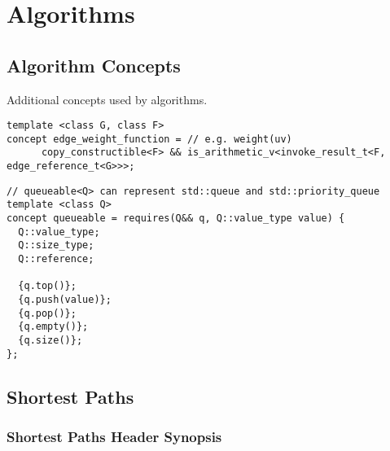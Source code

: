 \section{Algorithms}

\subsection{Algorithm Concepts}
Additional concepts used by algorithms.

\begin{lstlisting}
template <class G, class F>
concept edge_weight_function = // e.g. weight(uv)
      copy_constructible<F> && is_arithmetic_v<invoke_result_t<F, edge_reference_t<G>>>;
\end{lstlisting}

\begin{lstlisting}
// queueable<Q> can represent std::queue and std::priority_queue
template <class Q>
concept queueable = requires(Q&& q, Q::value_type value) {
  Q::value_type;
  Q::size_type;
  Q::reference;

  {q.top()};
  {q.push(value)};
  {q.pop()};
  {q.empty()};
  {q.size()};
};
\end{lstlisting}



\subsection{Shortest Paths}



\subsubsection{Shortest Paths Header Synopsis}



